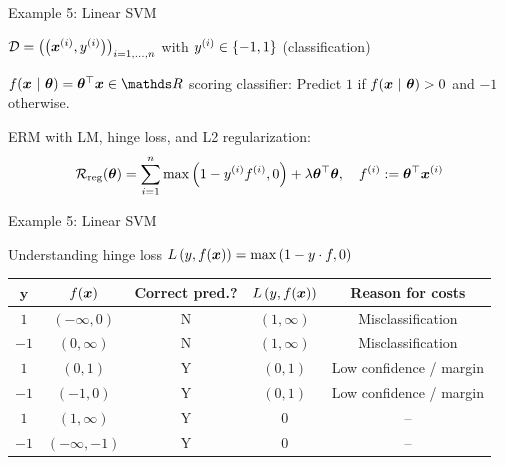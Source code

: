 \documentclass[11pt,compress,t,notes=noshow, xcolor=table]{beamer}
\begin{document}
\begin{framei}{Example 5: Linear SVM}
\item $\mathcal{D} = \left(\left(\bm{x}^{(i)}, y^{(i)}\right)\right)_{i = 1, ..., n}$ with $y^{(i)} \in \{-1, 1\}$ (classification)
\item $\fxt = \thetav^\top \xv \in \R$ scoring classifier: Predict $1$ if $f(\bm{x} ~|~ \bm{\theta}) > 0$ and $-1$ otherwise.
\item ERM with LM, hinge loss, and L2 regularization:
$$ \mathcal{R}_{\text{reg}}(\bm{\theta}) = \sum\limits_{i=1}^n \max\left(1 - y^{(i)} f^{(i)}, 0\right) + \lambda \bm{\theta}^\top \bm{\theta}, \quad f^{(i)} := \bm{\theta}^\top \bm{x}^{(i)} $$
\vfill
{}
\end{framei}


\begin{framei}[fs=small]{Example 5: Linear SVM}
\item Understanding hinge loss $L\left(y, f(\bm{x})\right) = \max\left(1 - y\cdot f, 0\right)$
\item[] \begin{tabular}{ c | c | c | c | c }
$\mathbf{y}$ & $f(\bm{x})$ &  \textbf{Correct pred.?}  & $L\left(y, f(\bm{x})\right)$ & \textbf{Reason for costs}  \\ \hline
 $1$ & $(- \infty, 0)$  & N & $(1, \infty)$ & Misclassification \\
 $- 1$ & $(0, \infty)$ & N  & $(1, \infty)$ &  Misclassification \\
 $1$ & $(0, 1)$ & Y & $(0, 1)$ & Low confidence / margin \\
 $- 1$ & $(-1, 0)$  & Y  & $(0, 1)$& Low confidence / margin\\
 $1$ & $(1, \infty)$ &  Y & $0$ & -- \\
 $- 1$ & $(- \infty, -1)$ &  Y & $0$ & -- \\
\end{tabular}
\vfill
{}
\end{framei}
\end{document}
